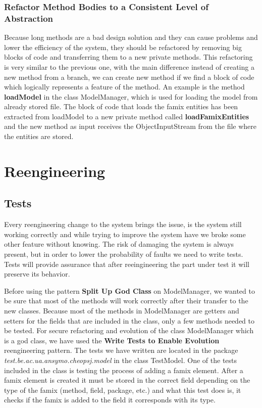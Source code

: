 \documentclass[a4paper]{article}
\begin{document}
\subsubsection{Refactor Method Bodies to a Consistent Level of Abstraction}
Because long methods are a bad design solution and they can cause problems and lower the efficiency of the system, they should be refactored by removing big blocks of code and transferring them to a new private methods. This refactoring is very similar to the previous one, with the main difference instead of creating a new method from a branch, we can create new method if we find a block of code which logically represents a feature of the method. An example is the method \textbf{loadModel} in the class ModelManager, which is used for loading the model from already stored file. The block of code that loads the famix entities has been extracted from loadModel to a new private method called \textbf{loadFamixEntities} and the new method as input receives the ObjectInputStream from the file where the entities are stored.

\section{Reengineering}

\subsection{Tests}
Every reengineering change to the system brings the issue, is the system still working correctly and while trying to improve the system have we broke some other feature without knowing. The risk of damaging the system is always present, but in order to lower the probability of faults we need to write tests. Tests will provide assurance that after reeingineering the part under test it will preserve its behavior.

Before using the pattern \textbf{Split Up God Class} on ModelManager, we wanted to be sure that most of the methods will work correctly after their transfer to the new classes. Because most of the methods in ModelManager are getters and setters for the fields that are included in the class, only a few methods needed to be tested. For secure refactoring and evolution of the class ModelManager which is a god class, we have used the \textbf{Write Tests to Enable Evolution} reengineering pattern. The tests we have written are located in the package \emph{test.be.ac.ua.ansymo.cheopsj.model} in the class TestModel. One of the tests included in the class is testing the process of adding a famix element. After a famix element is created it must be stored in the correct field depending on the type of the famix (method, field, package, etc.) and what this test does is, it checks if the famix is added to the field it corresponds with its type.
\end{document}
